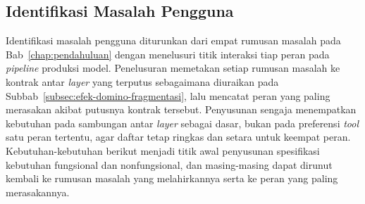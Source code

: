 \subsection{Identifikasi Masalah Pengguna}
\label{subsec:identifikasi-masalah}

Identifikasi masalah pengguna diturunkan dari empat rumusan masalah pada Bab~\ref{chap:pendahuluan} dengan menelusuri titik interaksi tiap peran pada \textit{pipeline} produksi model. Penelusuran memetakan setiap rumusan masalah ke kontrak antar \textit{layer} yang terputus sebagaimana diuraikan pada Subbab~\ref{subsec:efek-domino-fragmentasi}, lalu mencatat peran yang paling merasakan akibat putusnya kontrak tersebut. Penyusunan sengaja menempatkan kebutuhan pada sambungan antar \textit{layer} sebagai dasar, bukan pada preferensi \textit{tool} satu peran tertentu, agar daftar tetap ringkas dan setara untuk keempat peran. Kebutuhan-kebutuhan berikut menjadi titik awal penyusunan spesifikasi kebutuhan fungsional dan nonfungsional, dan masing-masing dapat dirunut kembali ke rumusan masalah yang melahirkannya serta ke peran yang paling merasakannya.


